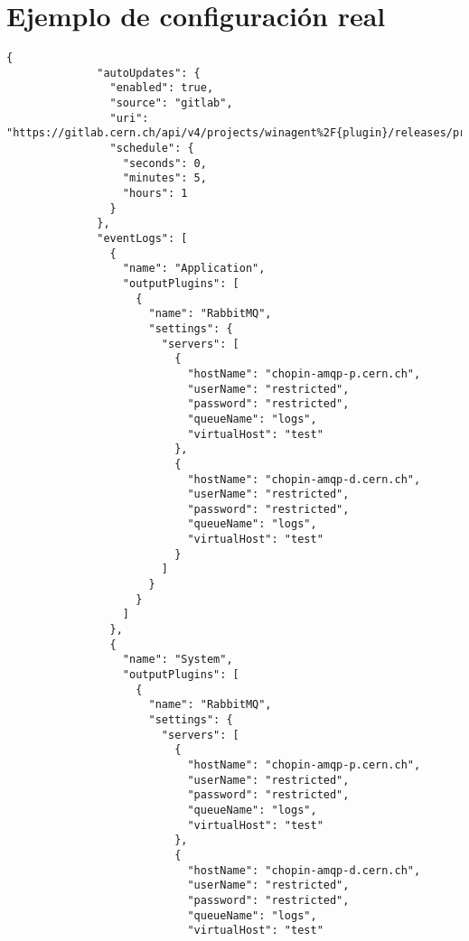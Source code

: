     \section{Ejemplo de configuración real}\label{anx:settings}
        \begin{lstlisting}[style=csharp, caption=Fichero de configuración]
            {
              "autoUpdates": {
                "enabled": true,
                "source": "gitlab",
                "uri": "https://gitlab.cern.ch/api/v4/projects/winagent%2F{plugin}/releases/production",
                "schedule": {
                  "seconds": 0,
                  "minutes": 5,
                  "hours": 1
                }
              },
              "eventLogs": [
                {
                  "name": "Application",
                  "outputPlugins": [
                    {
                      "name": "RabbitMQ",
                      "settings": {
                        "servers": [
                          {
                            "hostName": "chopin-amqp-p.cern.ch",
                            "userName": "restricted",
                            "password": "restricted",
                            "queueName": "logs",
                            "virtualHost": "test"
                          },
                          {
                            "hostName": "chopin-amqp-d.cern.ch",
                            "userName": "restricted",
                            "password": "restricted",
                            "queueName": "logs",
                            "virtualHost": "test"
                          }
                        ]
                      }
                    }
                  ]
                },
                {
                  "name": "System",
                  "outputPlugins": [
                    {
                      "name": "RabbitMQ",
                      "settings": {
                        "servers": [
                          {
                            "hostName": "chopin-amqp-p.cern.ch",
                            "userName": "restricted",
                            "password": "restricted",
                            "queueName": "logs",
                            "virtualHost": "test"
                          },
                          {
                            "hostName": "chopin-amqp-d.cern.ch",
                            "userName": "restricted",
                            "password": "restricted",
                            "queueName": "logs",
                            "virtualHost": "test"

\end{lstlisting}
